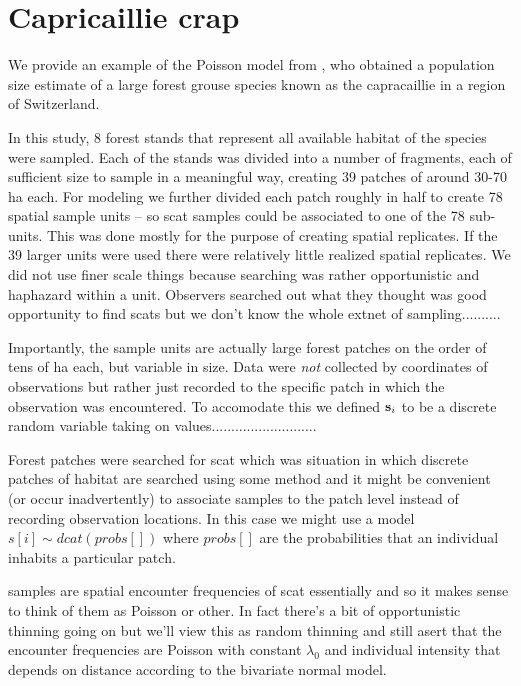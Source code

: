 \section{Capricaillie crap}

We provide an example of the Poisson model from
 \citet{mollet_etal:2012}, who obtained a population
size estimate  of a large forest grouse species known as the
capracaillie in a region of Switzerland.

In this study,
8 forest stands  that represent all available habitat of the
species were sampled. Each of the stands was divided into a number of
fragments, each of
sufficient size to sample in a meaningful way, creating 39 patches of around
30-70 ha each. For modeling we further divided each patch roughly in half to
create 78 spatial sample units -- so scat samples could be associated to one of
the 78 sub-units. This was done mostly for the purpose of creating spatial
replicates. If the 39 larger units were used there were relatively little
realized spatial replicates.
We did not use finer scale things because searching was rather opportunistic
and haphazard within a unit. Observers searched out what they thought was
good opportunity to find scats but we don't know the whole extnet of
sampling..........

Importantly, the sample units are actually large forest
patches on the order of tens of ha each, but variable in size. Data
were {\it not} collected by coordinates of observations but rather
just recorded to the specific patch in which the observation was
encountered. To accomodate this we defined ${\bf s}_{i}$ to be a
discrete
random variable taking on values...........................

Forest patches were searched for scat which was
situation in which discrete patches of habitat are searched using some
method and it might be convenient (or occur inadvertently) to
associate samples to the patch level instead of recording observation
locations. In this case we might use a model $s[i] \sim dcat(probs[])$
where $probs[]$ are the probabilities that an individual inhabits a
particular patch.

samples are spatial encounter frequencies of scat essentially and so
it makes sense to think of them as Poisson or other.
In fact there's a bit of opportunistic thinning going on but we'll view
this as random thinning and still asert that the encounter frequencies
are Poisson with constant $\lambda_{0}$ and individual intensity that
depends on distance according to the bivariate normal model.



